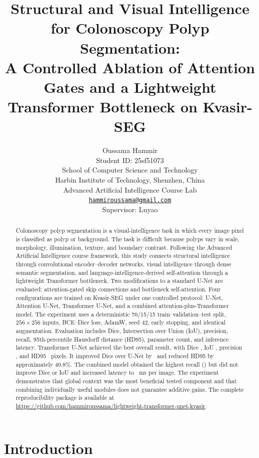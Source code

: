 \documentclass[a4paper,10pt]{article}
\title{Structural and Visual Intelligence for Colonoscopy Polyp Segmentation:\\
A Controlled Ablation of Attention Gates and a Lightweight Transformer Bottleneck on Kvasir-SEG}
\author{
Oussama Hammir \\
Student ID: 25sf51073 \\
School of Computer Science and Technology \\
Harbin Institute of Technology, Shenzhen, China \\
Advanced Artificial Intelligence Course Lab \\
\href{mailto:hammiroussama@gmail.com}{\texttt{hammiroussama@gmail.com}} \\
Supervisor: Luyao
}
\begin{document}
\maketitle
\thispagestyle{empty}

\begin{abstract}
Colonoscopy polyp segmentation is a visual-intelligence task in which every image pixel is classified as polyp or background. The task is difficult because polyps vary in scale, morphology, illumination, texture, and boundary contrast. Following the Advanced Artificial Intelligence course framework, this study connects structural intelligence through convolutional encoder--decoder networks, visual intelligence through dense semantic segmentation, and language-intelligence-derived self-attention through a lightweight Transformer bottleneck. Two modifications to a standard U-Net are evaluated: attention-gated skip connections and bottleneck self-attention. Four configurations are trained on Kvasir-SEG under one controlled protocol: U-Net, Attention U-Net, Transformer U-Net, and a combined attention-plus-Transformer model. The experiment uses a deterministic 70/15/15 train--validation--test split, $256\times256$ inputs, BCE--Dice loss, AdamW, seed 42, early stopping, and identical augmentation. Evaluation includes Dice, Intersection over Union (IoU), precision, recall, 95th-percentile Hausdorff distance (HD95), parameter count, and inference latency. Transformer U-Net achieved the best overall result, with Dice \BestDice, IoU \BestIoU, precision \TransformerUNetPrecision, and HD95 \TransformerUNetHD~pixels. It improved Dice over U-Net by \DiceGain~and reduced HD95 by approximately 40.8\%. The combined model obtained the highest recall (\ProposedRecall) but did not improve Dice or IoU and increased latency to \ProposedLatency~ms per image. The experiment demonstrates that global context was the most beneficial tested component and that combining individually useful modules does not guarantee additive gains. The complete reproducibility package is available at \url{https://github.com/hammiroussama/lightweight-transformer-unet-kvasir}.
\end{abstract}


\clearpage
\setcounter{page}{1}

\section{Introduction}
\label{sec:introduction}
\end{document}
